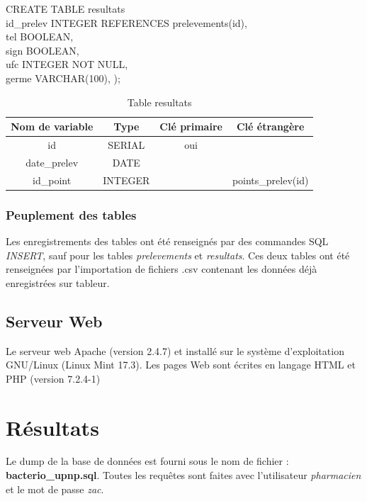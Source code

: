 \documentclass[12pt,a4paper,oneside]{article}
\begin{document}
\begin{description}
\begin{tabbing}
CREATE TABLE resultats\\
id\_prelev INTEGER REFERENCES prelevements(id),\\
\nopagebreak
tel BOOLEAN,\\
sign BOOLEAN,\\
ufc INTEGER NOT NULL,\\
germe VARCHAR(100),
);
\end{tabbing}
\begin{table}
\caption{Table resultats \label{resultats}}
\begin{center}
\begin{tabular}{|c|c|c|c|}
	\hline
	\textbf{Nom de variable} & \textbf{Type} & \textbf{Clé primaire} & \textbf{Clé étrangère}\\
	\hline
	id & SERIAL & oui & \\
	date\_prelev & DATE & &\\
	id\_point & INTEGER & & points\_prelev(id)\\
	\hline
\end{tabular}
\end{center}
\end{table}

\end{description}

\subsubsection{Peuplement des tables}
Les enregistrements des tables ont été renseignés par des commandes SQL \emph{INSERT}, sauf pour les tables \emph{prelevements} et \emph{resultats}. Ces deux tables ont été renseignées par l'importation de fichiers .csv contenant les données déjà enregistrées sur tableur.
\subsection{Serveur Web}
Le serveur web Apache (version 2.4.7) et installé sur le système d'exploitation GNU/Linux (Linux Mint 17.3).
Les pages Web sont écrites en langage HTML et PHP (version 7.2.4-1)
\section{Résultats}
Le dump de la base de données est fourni sous le nom de fichier : \textbf{bacterio\_upnp.sql}. Toutes les requêtes sont faites avec l'utilisateur \emph{pharmacien} et le mot de passe \emph{zac}.
\end{document}
